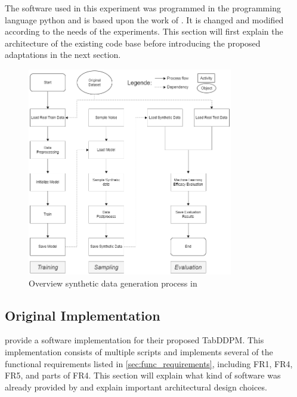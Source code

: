 The software \cite{akim2023TabDDPMModellingTabular} used in this experiment was programmed in the programming language python \cite{van1995python} and is based upon the work of \cite{kotelnikov2022TabDDPMModellingTabular}.
It is changed and modified according to the needs of the experiments.
This section will first explain the architecture of the existing code base before introducing the proposed adaptations in the next section.

\begin{figure}[h]
	\centering
	\includegraphics[width=0.8\textwidth]{images/Overall_original.png}
	\caption[Overview Original Software]{Overview synthetic data generation process in \cite{akim2023TabDDPMModellingTabular}}
	\label{fig:overall_original}
\end{figure}


\subsection{Original Implementation}
\label{ch:conceptualDesign-existingCodeBase-originalImplementation}

\textcite{akim2023TabDDPMModellingTabular} provide a software implementation for their proposed TabDDPM.
This implementation consists of multiple scripts and implements several of the functional requirements listed in \autoref{sec:func_requirements}, including FR1, FR4, FR5, and parts of FR4.
This section will explain what kind of software was already provided by \cite{kotelnikov2022TabDDPMModellingTabular} and explain important architectural design choices.

